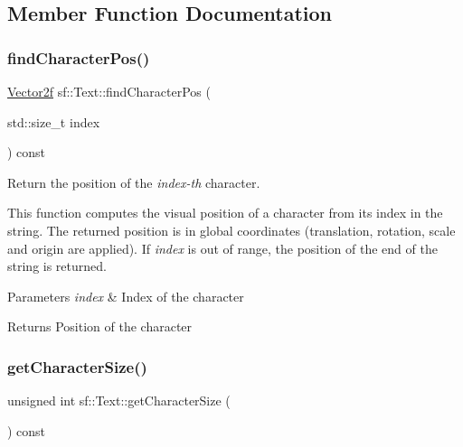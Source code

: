 \subsection{Member Function Documentation}
\mbox{\label{classsf_1_1_text_a2e252d8dcae3eb61c6c962c0bc674b12}} 
\subsubsection{\texorpdfstring{find\+Character\+Pos()}{findCharacterPos()}}
{\footnotesize\ttfamily \hyperlink{classsf_1_1_vector2}{Vector2f} sf\+::\+Text\+::find\+Character\+Pos (\begin{DoxyParamCaption}\item[{std\+::size\+\_\+t}]{index }\end{DoxyParamCaption}) const}



Return the position of the {\itshape index-\/th} character. 

This function computes the visual position of a character from its index in the string. The returned position is in global coordinates (translation, rotation, scale and origin are applied). If {\itshape index} is out of range, the position of the end of the string is returned.


\begin{DoxyParams}{Parameters}
{\em index} & Index of the character\\
\hline
\end{DoxyParams}
\begin{DoxyReturn}{Returns}
Position of the character 
\end{DoxyReturn}
\mbox{\label{classsf_1_1_text_a46d1d7f1d513bb8d434e985a93ea5224}} 
\subsubsection{\texorpdfstring{get\+Character\+Size()}{getCharacterSize()}}
{\footnotesize\ttfamily unsigned int sf\+::\+Text\+::get\+Character\+Size (\begin{DoxyParamCaption}{ }\end{DoxyParamCaption}) const}



